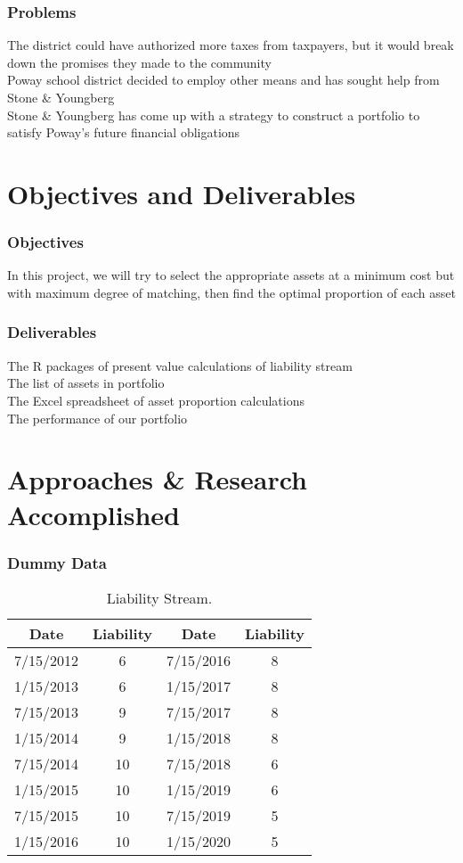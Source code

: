 \documentclass[compress,handout,10pt]{beamer}
\begin{document}
\begin{frame}
    \frametitle{Problems}
The district could have authorized more taxes from taxpayers, but it would break down the promises they made to the community  \\
\vspace{3mm}
Poway school district decided to employ other means and has sought help from Stone \& Youngberg \\
\vspace{3mm}
Stone \& Youngberg has come up with a strategy to construct a portfolio to satisfy Poway's future financial obligations\\


\end{frame}

\section{Objectives and Deliverables}

\begin{frame}
    \frametitle{Objectives}
In this project, we will try to select the appropriate assets at a minimum cost but with maximum degree of matching, then find the optimal proportion of each asset 
\end{frame}

\begin{frame}
    \frametitle{Deliverables}
The R packages of present value calculations of liability stream\\
\vspace{3mm}
The list of assets in portfolio\\
\vspace{3mm}
The Excel spreadsheet of asset proportion calculations\\
\vspace{3mm}
The performance of our portfolio
\end{frame}

\section{Approaches \& Research Accomplished}

\begin{frame}
    \frametitle{Dummy Data}
\begin{table}[h]
\centering  
\begin{tabular}{cccc}
\hline
Date  &Liability  &Date  &Liability\\ \hline  
7/15/2012  &6  &7/15/2016  &8\\
1/15/2013  &6  &1/15/2017  &8\\ 
7/15/2013  &9  &7/15/2017  &8\\ 
1/15/2014  &9  &1/15/2018  &8\\ 
7/15/2014  &10 &7/15/2018  &6\\ 
1/15/2015  &10  &1/15/2019  &6\\ 
7/15/2015  &10  &7/15/2019  &5 \\ 
1/15/2016  &10  &1/15/2020  &5\\ \hline
\end{tabular}
\caption{Liability Stream.}
\end{table}
\end{frame}
\end{document}
